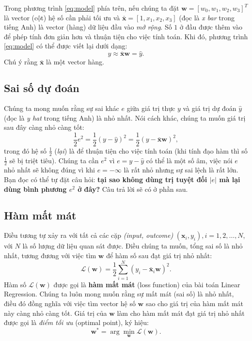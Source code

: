 \documentclass[runningheads]{llncs}
\begin{document}
Trong phương trình \eqref{eq:model} phía trên, nếu chúng ta đặt
$\mathbf{w} = [w_0, w_1, w_2, w_3]^T$ là vector (cột) hệ số cần phải tối ưu
và $\bar{\mathbf{x}} = [1, x_1, x_2, x_3]$ (đọc là \emph{x bar} trong tiếng
Anh) là vector (hàng) dữ liệu đầu vào \emph{mở rộng}. Số $1$ ở đầu được thêm
vào để phép tính đơn giản hơn và thuận tiện cho việc tính toán. Khi đó,
phương trình \eqref{eq:model} có thể được viết lại dưới dạng:
\[
y \approx \bar{\mathbf{x}}\mathbf{w} = \hat{y}.
\]
Chú ý rằng $\bar{\mathbf{x}}$ là một vector hàng.

\subsection{Sai số dự đoán}

Chúng ta mong muốn rằng sự sai khác $e$ giữa giá trị thực $y$ và giá trị dự
đoán $\hat{y}$ (đọc là \emph{y hat} trong tiếng Anh) là nhỏ nhất. Nói cách
khác, chúng ta muốn giá trị sau đây càng nhỏ càng tốt:
\[
\frac{1}{2}e^2
= \frac{1}{2}(y - \hat{y})^2
= \frac{1}{2}(y - \bar{\mathbf{x}}\mathbf{w})^2,
\]
trong đó hệ số $\frac{1}{2}$ (\emph{lại}) là để thuận tiện cho việc tính toán
(khi tính đạo hàm thì số $\frac{1}{2}$ sẽ bị triệt tiêu). Chúng ta cần $e^2$
vì $e = y - \hat{y}$ có thể là một số âm, việc nói $e$ nhỏ nhất sẽ không đúng
vì khi $e = -\infty$ là rất nhỏ nhưng sự sai lệch là rất lớn. Bạn đọc có thể
tự đặt câu hỏi: \textbf{tại sao không dùng trị tuyệt đối $|e|$ mà lại dùng
bình phương $e^2$ ở đây?} Câu trả lời sẽ có ở phần sau.

\subsection{Hàm mất mát}

Điều tương tự xảy ra với tất cả các cặp \emph{(input, outcome)}
$(\mathbf{x}_i, y_i), i = 1, 2, \dots, N$, với $N$ là số lượng dữ liệu quan
sát được. Điều chúng ta muốn, tổng sai số là nhỏ nhất, tương đương với việc
tìm $\mathbf{w}$ để hàm số sau đạt giá trị nhỏ nhất:
\begin{equation}
\label{eq:loss}
\mathcal{L}(\mathbf{w})
= \frac{1}{2}\sum_{i=1}^N \left(y_i - \bar{\mathbf{x}}_i\mathbf{w}\right)^2.
\end{equation}
Hàm số $\mathcal{L}(\mathbf{w})$ được gọi là \textbf{hàm mất mát} (loss
function) của bài toán Linear Regression. Chúng ta luôn mong muốn rằng sự mất
mát (sai số) là nhỏ nhất, điều đó đồng nghĩa với việc tìm vector hệ số
$\mathbf{w}$ sao cho giá trị của hàm mất mát này càng nhỏ càng tốt. Giá trị
của $\mathbf{w}$ làm cho hàm mất mát đạt giá trị nhỏ nhất được gọi là
\emph{điểm tối ưu} (optimal point), ký hiệu:
\[
\mathbf{w}^\ast = \arg\min_{\mathbf{w}} \mathcal{L}(\mathbf{w}).
\]
\end{document}
